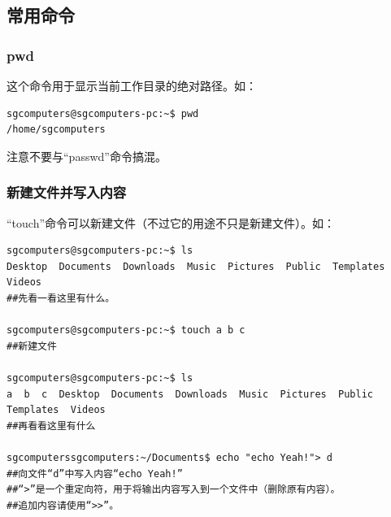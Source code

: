 \documentclass{book}
\begin{document}
\subsection{常用命令}
\subsubsection{pwd}
这个命令用于显示当前工作目录的绝对路径。如：
\begin{verbatim}
sgcomputers@sgcomputers-pc:~$ pwd
/home/sgcomputers
\end{verbatim}
注意不要与“passwd”命令搞混。
\subsubsection{新建文件并写入内容}
“touch”命令可以新建文件（不过它的用途不只是新建文件）。如：
\begin{verbatim}
sgcomputers@sgcomputers-pc:~$ ls
Desktop  Documents  Downloads  Music  Pictures  Public  Templates  Videos
##先看一看这里有什么。

sgcomputers@sgcomputers-pc:~$ touch a b c
##新建文件

sgcomputers@sgcomputers-pc:~$ ls
a  b  c  Desktop  Documents  Downloads  Music  Pictures  Public  Templates  Videos
##再看看这里有什么

sgcomputerssgcomputers:~/Documents$ echo "echo Yeah!"> d
##向文件“d”中写入内容“echo Yeah!”
##“>”是一个重定向符，用于将输出内容写入到一个文件中（删除原有内容）。
##追加内容请使用“>>”。
\end{verbatim}
\end{document}
